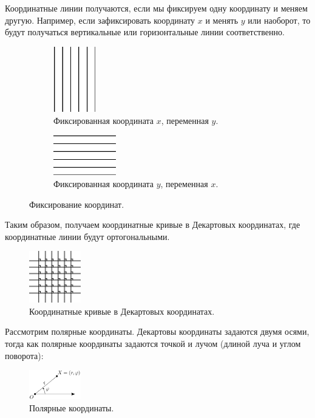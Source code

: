 \documentclass[12pt]{article}
\theoremstyle{definition}
\begin{document}
Координатные линии получаются, если мы фиксируем одну координату и меняем другую. Например, если зафиксировать координату $x$ и менять $y$ или наоборот, то будут получаться вертикальные или горизонтальные линии соответственно.
\begin{figure}[H]
	\begin{subfigure}[t]{.5\textwidth}
		\centering
		\includegraphics[width=0.2\textwidth]{ANGL2_18.eps}
		\caption{Фиксированная координата $x$, переменная $y$.}
		\label{2_18}
	\end{subfigure}
	\begin{subfigure}[t]{.5\textwidth}
		\centering
		\includegraphics[width=0.3\textwidth]{ANGL2_19.eps}
		\caption{Фиксированная координата $y$, переменная $x$.}
		\label{2_19}
	\end{subfigure}
	\caption{Фиксирование координат.}
\end{figure}
Таким образом, получаем координатные кривые в Декартовых координатах, где координатные линии будут ортогональными.
\begin{figure}[H]
	\centering
	\includegraphics[width=0.2\textwidth]{ANGL2_20.eps}
	\caption{Координатные кривые в Декартовых координатах.}
	\label{2_20}
\end{figure}
Рассмотрим полярные координаты. Декартовы координаты задаются двумя осями, тогда как полярные координаты задаются точкой и лучом (длиной луча и углом поворота):
\begin{figure}[H]
	\centering
	\includegraphics[width=0.2\textwidth]{ANGL2_21.png}
	\caption{Полярные координаты.}
	\label{2_21}
\end{figure}
\end{document}
